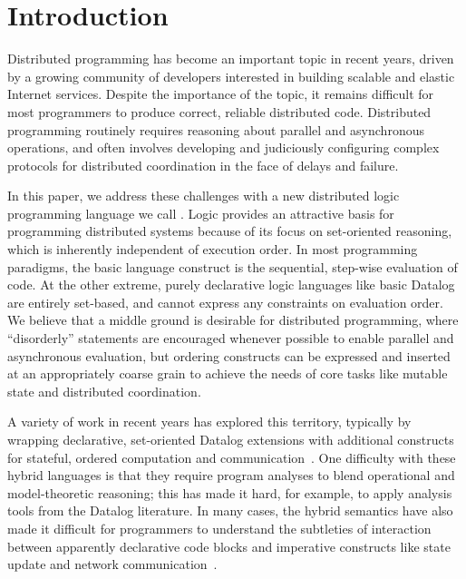 \section{Introduction}
Distributed programming has become an important topic in recent years, driven by a growing community of developers interested in building scalable and elastic Internet services.  Despite the importance of the topic, it remains difficult for most programmers to produce correct, reliable distributed code.  Distributed programming routinely requires reasoning about parallel and asynchronous operations, and often involves developing and judiciously configuring complex protocols for distributed coordination in the face of delays and failure.

In this paper, we address these challenges with a new distributed logic programming language we call {\em \lang}.
Logic provides an attractive basis for programming distributed systems because of its focus on set-oriented reasoning, which is inherently independent of execution order.  In most programming paradigms, the basic language construct is the sequential, step-wise evaluation of code. At the other extreme, purely declarative logic languages like basic Datalog are entirely set-based, and cannot express any constraints on evaluation order.  We believe that  a middle ground is desirable for distributed programming, where ``disorderly'' statements are encouraged whenever possible to enable parallel and asynchronous evaluation, but ordering constructs can be expressed and inserted at an appropriately coarse grain to achieve the needs of core tasks like mutable state and distributed coordination.

A variety of work in recent years has explored this territory, typically by wrapping declarative, set-oriented Datalog extensions with additional constructs for stateful, ordered computation and communication~\cite{p2,reactors,meld,prologevents}.  One difficulty with these hybrid languages is that they require program analyses to blend operational and model-theoretic reasoning; this has made it hard, for example, to apply analysis tools from the Datalog literature.  In many cases, the hybrid semantics have also made it difficult for programmers to understand the subtleties of interaction between apparently declarative code blocks and imperative constructs like state update and network communication~\cite{Mao2009,navarro}.

